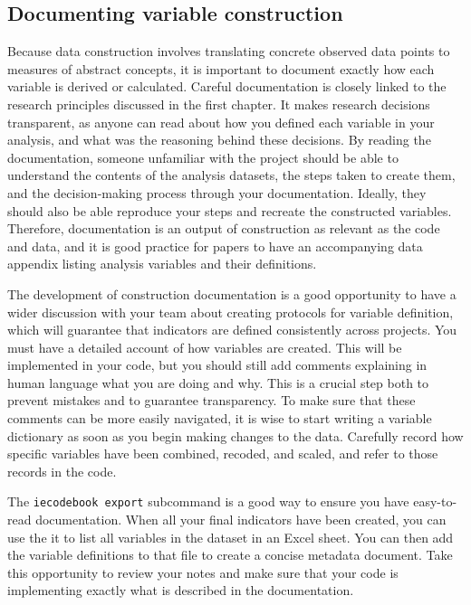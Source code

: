 \subsection{Documenting variable construction}

Because data construction involves translating concrete observed data points
to measures of abstract concepts,
it is important to document exactly how each variable is derived or calculated.
Careful documentation is closely linked to the research principles discussed in the first chapter.
It makes research decisions transparent, 
as anyone can read about how you defined each variable in your analysis,
and what was the reasoning behind these decisions.
By reading the documentation, 
someone unfamiliar with the project should be able to understand the contents of the analysis datasets,
the steps taken to create them, and the decision-making process through your documentation.
Ideally, they should also be able reproduce your steps and recreate the constructed variables.
Therefore, documentation is an output of construction as relevant as the code and data,
and it is good practice for papers to have an accompanying data appendix
listing analysis variables and their definitions.

The development of construction documentation is a good opportunity to have 
a wider discussion with your team about creating protocols for variable definition,
which will guarantee that indicators are defined consistently across projects.
You must have a detailed account of how variables are created.
This will be implemented in your code, but you should still
add comments explaining in human language what you are doing and why.
This is a crucial step both to prevent mistakes and to guarantee transparency.
To make sure that these comments can be more easily navigated,
it is wise to start writing a variable dictionary as soon as you begin making changes to the data.
Carefully record how specific variables have been combined, recoded, and scaled,
and refer to those records in the code.

The \texttt{iecodebook export} subcommand is 
a good way to ensure you have easy-to-read documentation.
When all your final indicators have been created,
you can use the it to list all variables in the dataset in an Excel sheet.
You can then add the variable definitions to that file to create a concise metadata document.
Take this opportunity to review your notes and make sure that your code
is implementing exactly what is described in the documentation.

